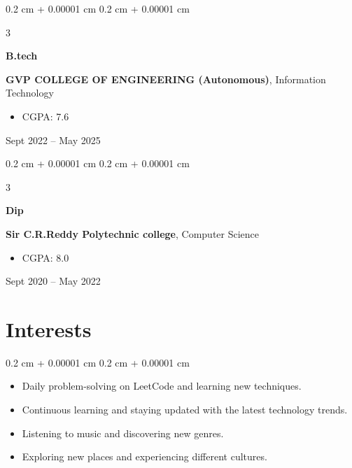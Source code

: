 \documentclass[10pt, letterpaper]{article}
\newenvironment{highlights}{
    \begin{itemize}[
        topsep=0.10 cm,
        parsep=0.10 cm,
        partopsep=0pt,
        itemsep=0pt,
        leftmargin=0.4 cm + 10pt
    ]
}{
    \end{itemize}
} %
\newenvironment{highlightsforbulletentries}{
    \begin{itemize}[
        topsep=0.10 cm,
        parsep=0.10 cm,
        partopsep=0pt,
        itemsep=0pt,
        leftmargin=10pt
    ]
}{
    \end{itemize}
} %
\newenvironment{onecolentry}{
    \begin{adjustwidth}{
        0.2 cm + 0.00001 cm
    }{
        0.2 cm + 0.00001 cm
    }
}{
    \end{adjustwidth}
} %
\newenvironment{threecolentry}[3][]{
    \onecolentry
    \def\thirdColumn{#3}
    \setcolumnwidth{1 cm, \fill, 4.5 cm}
    \begin{paracol}{3}
    {\raggedright #2} \switchcolumn
}{
    \switchcolumn \raggedleft \thirdColumn
    \end{paracol}
    \endonecolentry
} %
\begin{document}
        \begin{threecolentry}{\textbf{B.tech}}{
            Sept 2022 – May 2025
        }
            \textbf{GVP COLLEGE OF ENGINEERING (Autonomous)}, Information Technology
            \begin{highlights}
                \item CGPA: 7.6
            \end{highlights}
        \end{threecolentry}

        \vspace{0.2 cm}

        \begin{threecolentry}{\textbf{Dip}}{
            Sept 2020 – May 2022
        }
            \textbf{Sir C.R.Reddy Polytechnic college}, Computer Science
            \begin{highlights}
                \item CGPA: 8.0
            \end{highlights}
        \end{threecolentry}



    \section{Interests}

    \begin{onecolentry}
        \begin{highlightsforbulletentries}


        \item Daily problem-solving on LeetCode and learning new techniques.

        \item Continuous learning and staying updated with the latest technology trends.

        \item Listening to music and discovering new genres.

        \item Exploring new places and experiencing different cultures.


        \end{highlightsforbulletentries}
    \end{onecolentry}
\end{document}
